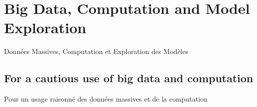 
\newpage



\section{Big Data, Computation and Model Exploration}{Données Massives, Computation et Exploration des Modèles}






\subsection{For a cautious use of big data and computation}{Pour un usage raisonné des données massives et de la computation}

